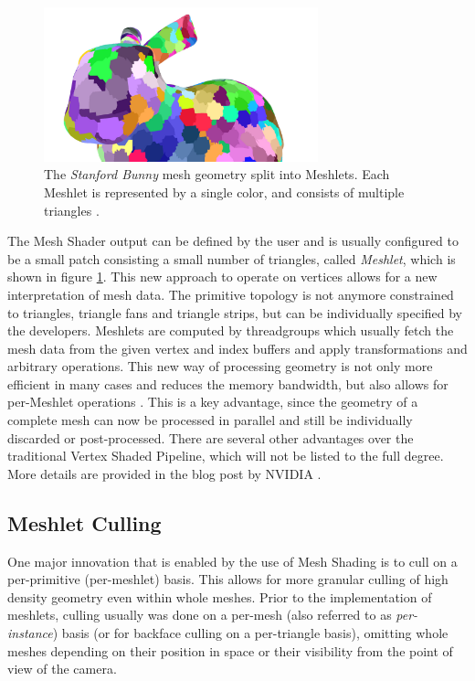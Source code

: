 \begin{figure}[h]
    \centering
    \includegraphics[width=300px]{images/graphics/bunny-meshlet.jpg}
    \caption{The \emph{Stanford Bunny} mesh geometry split into Meshlets. Each Meshlet is represented by a single color, 
    and consists of multiple triangles \cite{Oberberger2024}.}
    \label{fig:bunny-meshlet}
\end{figure}

\noindent
The Mesh Shader output can be defined by the user and is usually configured to be a small patch consisting a small 
number of triangles, called \emph{Meshlet}, which is shown in figure \ref{fig:bunny-meshlet}. This new approach 
to operate on vertices allows for a new interpretation of mesh data. The primitive topology is not anymore constrained 
to triangles, triangle fans and triangle strips, but can be individually specified by the developers.
Meshlets are computed by threadgroups which usually fetch the mesh data from the given vertex and index buffers and 
apply transformations and arbitrary operations. This new way of processing geometry is not only more efficient in many 
cases and reduces the memory bandwidth, but also allows for per-Meshlet operations \cite{Kubisch2020}. This is a key 
advantage, since the geometry of a complete mesh can now be processed in parallel and still be individually discarded 
or post-processed. There are several other advantages over the traditional Vertex Shaded Pipeline, which will not be 
listed to the full degree. More details are provided in the blog post by NVIDIA \cite{Kubisch2020}.\\


\subsection*{Meshlet Culling} \label{subsec-meshlet-culling}

One major innovation that is enabled by the use of Mesh Shading is to cull on a per-primitive (per-meshlet) basis. 
This allows for more granular culling of high density geometry even within whole meshes. Prior to the implementation 
of meshlets, culling usually was done on a per-mesh (also referred to as \emph{per-instance}) basis (or for backface 
culling on a per-triangle basis), omitting whole meshes depending on their position in space or their visibility from 
the point of view of the camera.\\

